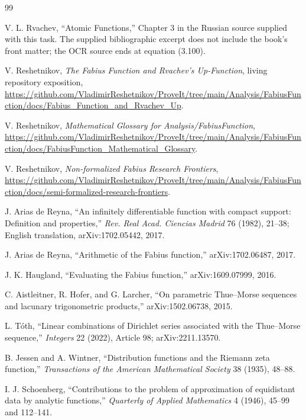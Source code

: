 \documentclass[11pt,oneside]{article}
\numberwithin{equation}{section}
\theoremstyle{definition}
\theoremstyle{remark}
\begin{document}
\begin{thebibliography}{99}

V. L. Rvachev, ``Atomic Functions,'' Chapter 3 in the Russian source supplied
with this task.  The supplied bibliographic excerpt does not include the book's
front matter; the OCR source ends at equation (3.100).

V. Reshetnikov,
\emph{The Fabius Function and Rvachev's Up-Function}, living repository
exposition,
\url{https://github.com/VladimirReshetnikov/ProveIt/tree/main/Analysis/FabiusFunction/docs/Fabius_Function_and_Rvachev_Up}.

V. Reshetnikov,
\emph{Mathematical Glossary for Analysis/FabiusFunction},
\url{https://github.com/VladimirReshetnikov/ProveIt/tree/main/Analysis/FabiusFunction/docs/FabiusFunction_Mathematical_Glossary}.

V. Reshetnikov,
\emph{Non-formalized Fabius Research Frontiers},
\url{https://github.com/VladimirReshetnikov/ProveIt/tree/main/Analysis/FabiusFunction/docs/semi-formalized-research-frontiers}.

J. Arias de Reyna,
``An infinitely differentiable function with compact support: Definition and
properties,'' \emph{Rev. Real Acad. Ciencias Madrid} 76 (1982), 21--38;
English translation, arXiv:1702.05442, 2017.

J. Arias de Reyna,
``Arithmetic of the Fabius function,'' arXiv:1702.06487, 2017.

J. K. Haugland,
``Evaluating the Fabius function,'' arXiv:1609.07999, 2016.

C. Aistleitner, R. Hofer, and G. Larcher,
``On parametric Thue--Morse sequences and lacunary trigonometric products,''
arXiv:1502.06738, 2015.

L. T\'oth,
``Linear combinations of Dirichlet series associated with the Thue--Morse
sequence,'' \emph{Integers} 22 (2022), Article 98; arXiv:2211.13570.

B. Jessen and A. Wintner,
``Distribution functions and the Riemann zeta function,''
\emph{Transactions of the American Mathematical Society} 38 (1935), 48--88.

I. J. Schoenberg,
``Contributions to the problem of approximation of equidistant data by analytic
functions,'' \emph{Quarterly of Applied Mathematics} 4 (1946), 45--99 and
112--141.


\end{thebibliography}
\end{document}
